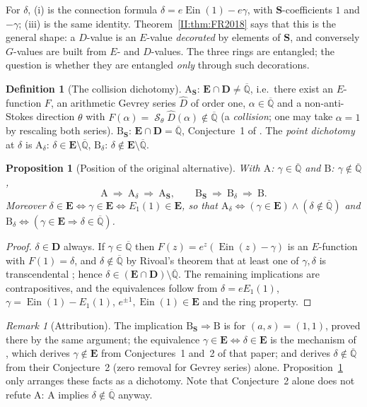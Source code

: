 \documentclass[11pt,a4paper]{article}
\newcommand{\Qbar}{\overline{\mathbb Q}}
\newcommand{\Ein}{\operatorname{Ein}}
\newcommand{\EE}{\mathbf E}
\newcommand{\DD}{\mathbf D}
\newcommand{\Sring}{\mathbf S}
\newcommand{\Dhat}{\widehat D}
\DeclareMathOperator{\Bsum}{\mathcal S}
\newtheorem{proposition}[theorem]{Proposition}
\theoremstyle{definition}
\newtheorem{definition}[theorem]{Definition}
\theoremstyle{remark}
\newtheorem{remark}[theorem]{Remark}
\numberwithin{equation}{section}
\begin{document}
For $\delta$, (i) is the connection formula $\delta=e\Ein(1)-e\gamma$, with
$\Sring$-coefficients $1$ and $-\gamma$; (iii) is the same identity. Theorem~\ref{II:thm:FR2018}
says that this is the general shape: a $D$-value is an $E$-value \emph{decorated} by elements
of $\Sring$, and conversely $G$-values are built from $E$- and $D$-values. The three rings
are entangled; the question is whether they are entangled \emph{only} through such
decorations.

\begin{definition}[The collision dichotomy]\label{II:def:dichotomy}
$\mathrm A_{\Sring}$: $\EE\cap\DD\ne\Qbar$, i.e.\ there exist an $E$-function $F$, an
arithmetic Gevrey series $\Dhat$ of order one, $\alpha\in\Qbar$ and a non-anti-Stokes
direction $\theta$ with $F(\alpha)=\Bsum_\theta\Dhat(\alpha)\notin\Qbar$ (a
\emph{collision}; one may take $\alpha=1$ by rescaling both series). $\mathrm B_{\Sring}$:
$\EE\cap\DD=\Qbar$, Conjecture~1 of \cite{FRmixed}. The \emph{point dichotomy} at $\delta$
is $\mathrm A_\delta$: $\delta\in\EE\setminus\Qbar$, $\mathrm B_\delta$:
$\delta\notin\EE\setminus\Qbar$.
\end{definition}

\begin{proposition}[Position of the original alternative]\label{II:prop:position}
With $\mathrm A$: $\gamma\in\Qbar$ and $\mathrm B$: $\gamma\notin\Qbar$,
\[
 \mathrm A\ \Longrightarrow\ \mathrm A_\delta\ \Longrightarrow\ \mathrm A_{\Sring},
 \qquad
 \mathrm B_{\Sring}\ \Longrightarrow\ \mathrm B_\delta\ \Longrightarrow\ \mathrm B .
\]
Moreover $\delta\in\EE\iff\gamma\in\EE\iff E_1(1)\in\EE$, so that
$\mathrm A_\delta\iff(\gamma\in\EE)\wedge(\delta\notin\Qbar)$ and
$\mathrm B_\delta\iff(\gamma\in\EE\Rightarrow\delta\in\Qbar)$.
\end{proposition}
\begin{proof}
$\delta\in\DD$ always. If $\gamma\in\Qbar$ then $F(z)=e^z(\Ein(z)-\gamma)$ is an
$E$-function with $F(1)=\delta$, and $\delta\notin\Qbar$ by Rivoal's theorem that at least
one of $\gamma,\delta$ is transcendental \cite[Thm.~2]{Rivoal2012}; hence
$\delta\in(\EE\cap\DD)\setminus\Qbar$. The remaining implications are contrapositives, and
the equivalences follow from $\delta=eE_1(1)$, $\gamma=\Ein(1)-E_1(1)$, $e^{\pm1},\Ein(1)\in\EE$
and the ring property.
\end{proof}

\begin{remark}[Attribution]
The implication $\mathrm B_{\Sring}\Rightarrow\mathrm B$ is \cite[Thm.~2]{FRmixed} for
$(a,s)=(1,1)$, proved there by the same argument; the equivalence
$\gamma\in\EE\Leftrightarrow\delta\in\EE$ is the mechanism of \cite[Prop.~1]{FRmixed}, which
derives $\gamma\notin\EE$ from Conjectures~1 and~2 of that paper; and
\cite[Cor.~1]{FRmixed} derives $\delta\notin\Qbar$ from their Conjecture~2 (zero removal for
Gevrey series) alone. Proposition~\ref{II:prop:position} only arranges these facts as a
dichotomy. Note that Conjecture~2 alone does not refute $\mathrm A$: $\mathrm A$ implies
$\delta\notin\Qbar$ anyway.
\end{remark}
\end{document}
